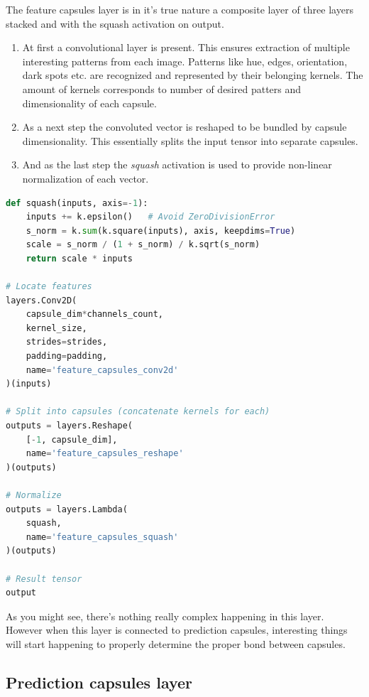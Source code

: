 The feature capsules layer is in it's true nature a composite layer of three layers stacked and with the squash activation on output.

\begin{enumerate}
    \item At first a convolutional layer is present. This ensures extraction of multiple interesting patterns from each image. Patterns like hue, edges, orientation, dark spots etc. are recognized and represented by their belonging kernels. The amount of kernels corresponds to number of desired patters and dimensionality of each capsule.
    \item As a next step the convoluted vector is reshaped to be bundled by capsule dimensionality. This essentially splits the input tensor into separate capsules.
    \item And as the last step the \textit{squash} activation is used to provide non-linear normalization of each vector.
\end{enumerate}


\begin{lstlisting}[language=Python, caption=Features capsule with squash activation]
def squash(inputs, axis=-1):
    inputs += k.epsilon()   # Avoid ZeroDivisionError
    s_norm = k.sum(k.square(inputs), axis, keepdims=True)
    scale = s_norm / (1 + s_norm) / k.sqrt(s_norm)
    return scale * inputs

# Locate features
layers.Conv2D(
    capsule_dim*channels_count,
    kernel_size,
    strides=strides,
    padding=padding,
    name='feature_capsules_conv2d'
)(inputs)

# Split into capsules (concatenate kernels for each)
outputs = layers.Reshape(
    [-1, capsule_dim],
    name='feature_capsules_reshape'
)(outputs)

# Normalize
outputs = layers.Lambda(
    squash,
    name='feature_capsules_squash'
)(outputs)

# Result tensor
output
\end{lstlisting}

As you might see, there's nothing really complex happening in this layer. However when this layer is connected to prediction capsules, interesting things will start happening to properly determine the proper bond between capsules.

\subsection{Prediction capsules layer}

